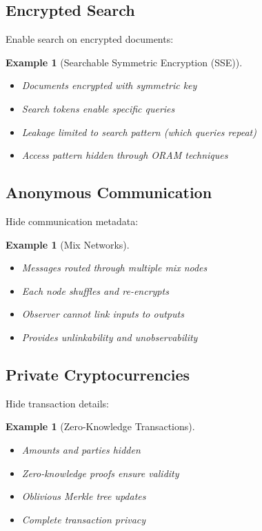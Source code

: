 \documentclass[11pt,final]{article}
\newtheorem{example}[theorem]{Example}
\begin{document}
\subsection{Encrypted Search}

Enable search on encrypted documents:

\begin{example}[Searchable Symmetric Encryption (SSE)]
\begin{itemize}
    \item Documents encrypted with symmetric key
    \item Search tokens enable specific queries
    \item Leakage limited to search pattern (which queries repeat)
    \item Access pattern hidden through ORAM techniques
\end{itemize}
\end{example}

\subsection{Anonymous Communication}

Hide communication metadata:

\begin{example}[Mix Networks]
\begin{itemize}
    \item Messages routed through multiple mix nodes
    \item Each node shuffles and re-encrypts
    \item Observer cannot link inputs to outputs
    \item Provides unlinkability and unobservability
\end{itemize}
\end{example}

\subsection{Private Cryptocurrencies}

Hide transaction details:

\begin{example}[Zero-Knowledge Transactions]
\begin{itemize}
    \item Amounts and parties hidden
    \item Zero-knowledge proofs ensure validity
    \item Oblivious Merkle tree updates
    \item Complete transaction privacy
\end{itemize}
\end{example}
\end{document}
